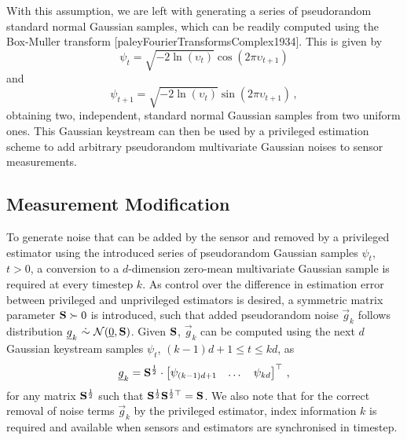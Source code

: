 With this assumption, we are left with generating a series of pseudorandom standard normal Gaussian samples, which can be readily computed using the Box-Muller transform [paleyFourierTransformsComplex1934]. This is given by
\begin{equation}
    \psi_t = \sqrt{-2\ln (\upsilon_t)}\cos(2\pi \upsilon_{t+1})
\end{equation}
and
\begin{equation}
    \psi_{t+1} = \sqrt{-2\ln (\upsilon_t)}\sin(2\pi \upsilon_{t+1})\,,
\end{equation}
obtaining two, independent, standard normal Gaussian samples from two uniform ones. This Gaussian keystream can then be used by a privileged estimation scheme to add arbitrary pseudorandom multivariate Gaussian noises to sensor measurements.

% 
% 

\subsection{Measurement Modification}\label{subsec:priv_estimation:est_measurement_mod}
To generate noise that can be added by the sensor and removed by a privileged estimator using the introduced series of pseudorandom Gaussian samples $\psi_t$, $t>0$, a conversion to a $d$-dimension zero-mean multivariate Gaussian sample is required at every timestep $k$. As control over the difference in estimation error between privileged and unprivileged estimators is desired, a symmetric matrix parameter ${{\mathbf{S}}}\succ 0$ is introduced, such that added pseudorandom noise $\vec{g}_k$ follows distribution $\vec{g}_k\ \dot{\sim}\ \mathcal{N}(\vec{0},\mat{S})$. Given ${{\mathbf{S}}}$, $\vec{g}_k$ can be computed using the next $d$ Gaussian keystream samples $\psi_t$, $(k-1)d+1\leq t\leq kd$, as
\begin{equation}\label{eq:priv_estimation:est_gaussian_noise_stream}
    {\underline{g}}_k = {{\mathbf{S}}}^{\frac{1}{2}}\cdot
    \begin{bmatrix}
        \psi_{(k-1)d+1} & \dots & \psi_{kd}
    \end{bmatrix}^\top\,,
\end{equation}
for any matrix ${{\mathbf{S}}}^{\frac{1}{2}}$ such that ${{\mathbf{S}}}^{\frac{1}{2}}{{\mathbf{S}}}^{\frac{1}{2}\top}={{\mathbf{S}}}$. We also note that for the correct removal of noise terms $\vec{g}_k$ by the privileged estimator, index information $k$ is required and available when sensors and estimators are synchronised in timestep.

